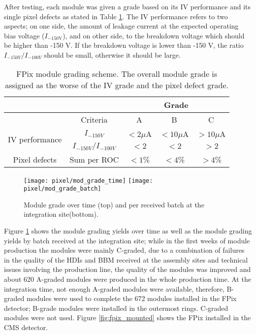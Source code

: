After testing, each module was given a grade based on its IV performance and its single pixel defects as stated in Table \ref{tab:grad_scheme}. The IV performance refers to two aspects; on one side, the amount of leakage current at the expected operating bias voltage ($I_{-150\textrm{V}}$), and on other side, to the breakdown voltage which should be higher than -150 V. If the breakdown voltage is lower than -150 V, the ratio $I_{-150V}/I_{-100V}$ should be small, otherwise it should be large.      

\begin{table}
  \centering
  \begin{tabular}{ c  c  c  c  c } \hline
                                    &                       & \multicolumn{3}{c}{Grade} \\\hline
                                    & Criteria              & A        &  B         &   C       \\\hline
    \multirow{2}{*}{IV performance} & $I_{-150V}$           & $<2\mu$A &  $<10\mu$A & $>10\mu$A \\
                                    & $I_{-150V}/I_{-100V}$ & $<2$     &  $<2$      & $>2$      \\\hline
    Pixel defects                   & Sum per ROC           & $<1$\%   &  $<4$\%    & $>4$\%    \\\hline
  \end{tabular}
  \caption[FPix module grading scheme.]{FPix module grading scheme. The overall module grade is assigned as the worse of the IV grade and the pixel defect grade.}\label{tab:grad_scheme}
\end{table}

\begin{figure}[h]
\begin{center}
  \texttt{[image: pixel/mod\_grade\_time]}
  \texttt{[image: pixel/mod\_grade\_batch]}
  \caption[Module grade over time.]{Module grade over time (top) and per received batch at the integration site(bottom).}\label{fig:mod_grad_time}
\end{center}
\end{figure}
Figure \ref{fig:mod_grad_time} shows the module grading yields over time as well as the module grading yields by batch received at the integration site; while in the first weeks of module production the modules were mainly C-graded, due to a combination of failures in the quality of the HDIs and BBM received at the assembly sites and technical issues involving the production line, the quality of the modules was improved and about 620 A-graded modules were produced in the whole production time. At the integration time, not enough A-graded modules were available, therefore, B-graded modules were used to complete the 672 modules installed in the FPix detector; B-grade modules were installed in the outermost rings. C-graded modules were not used. Figure \ref{fig:fpix_mounted} shows the FPix installed in the CMS detector.

